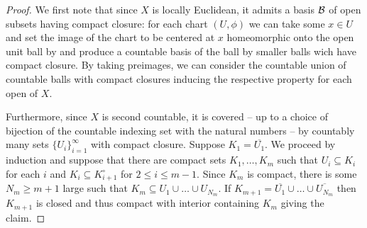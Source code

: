 \begin{proof}
    We first note that since $X$ is locally Euclidean, it admits a basis $\mathcal{B}$ of open subsets having compact closure: for each chart $(U,\phi)$ we can take some $x\in U$ and set the image of the chart to be centered at $x$ homeomorphic onto the open unit ball by  and produce a countable basis of the ball by smaller balls wich have compact closure. By taking preimages, we can consider the countable union of countable balls with compact closures inducing the respective property for each open of $X$. 
 
    Furthermore, since $X$ is second countable, it is covered -- up to a choice of bijection of the countable indexing set with the natural numbers -- by countably many sets $\{U_{i}\}_{i=1}^{\infty}$ with compact closure. Suppose $K_{1}=\overline{U_{1}}$. We proceed by induction and suppose that there are compact sets $K_{1},\dots,K_{m}$ such that $U_{i}\subseteq K_{i}$ for each $i$ and $K_{i}\subseteq K_{i+1}^{\circ}$ for $2\leq i\leq m-1$. Since $K_{m}$ is compact, there is some $N_{m}\geq m+1$ large such that $K_{m}\subseteq U_{1}\cup\dots\cup U_{N_{m}}$. If $K_{m+1}=\overline{U_{1}}\cup\dots\cup\overline{U_{N_{m}}}$ then $K_{m+1}$ is closed and thus compact with interior containing $K_{m}$ giving the claim. 
\end{proof}